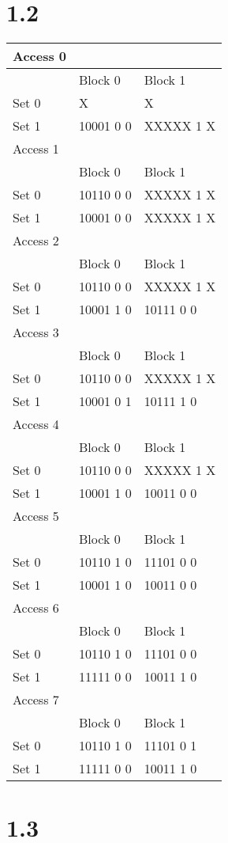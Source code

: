 \documentclass[10pt,a4paper]{article}
\begin{document}
\section*{1.2}

\begin{table}[]
	\centering
	\begin{tabular}{|l|l|l|}
		\hline
	Access 0	&  &  \\ \hline
		& Block 0 & Block 1  \\ \hline
	Set 0 	& X & X \\ \hline
	Set 1& 10001 0 0 & XXXXX 1 X \\ \hline
		Access 1&  &  \\ \hline
	& Block 0 & Block 1  \\ \hline
	Set 0	& 10110 0 0 & XXXXX 1 X  \\ \hline
	Set 1&  10001 0 0& XXXXX 1 X  \\ \hline
		Access 2	&  &  \\ \hline
	& Block 0 & Block 1  \\ \hline
	Set 0	& 10110 0 0& XXXXX 1 X  \\ \hline
	Set 1& 10001 1 0 & 10111 0 0  \\ \hline
		Access 3	&  &  \\ \hline
	& Block 0 & Block 1  \\ \hline
	Set 0	& 10110 0 0 & XXXXX 1 X  \\ \hline
	Set 1& 10001 0 1 & 10111 1 0  \\ \hline
		Access 4	&  &  \\ \hline
	& Block 0 & Block 1  \\ \hline
	Set 0	& 10110 0 0  & XXXXX 1 X  \\ \hline
	Set 1& 10001 1 0 & 10011 0 0  \\ \hline
	
		Access 5	&  &  \\ \hline
	& Block 0 & Block 1  \\ \hline
	Set 0	& 10110 1 0  & 11101 0 0  \\ \hline
	Set 1& 10001 1 0& 10011 0 0  \\ \hline
	
		Access 6	&  &  \\ \hline
	& Block 0 & Block 1  \\ \hline
	Set 0	& 10110 1 0  & 11101 0 0  \\ \hline
	Set 1& 11111 0 0 & 10011 1 0  \\ \hline
	
		Access 7	&  &  \\ \hline
	& Block 0 & Block 1  \\ \hline
	Set 0	& 10110 1 0  & 11101 0 1  \\ \hline
	Set 1& 11111 0 0& 10011 1 0  \\ \hline

	\end{tabular}
\end{table}
\section*{1.3}
\end{document}

